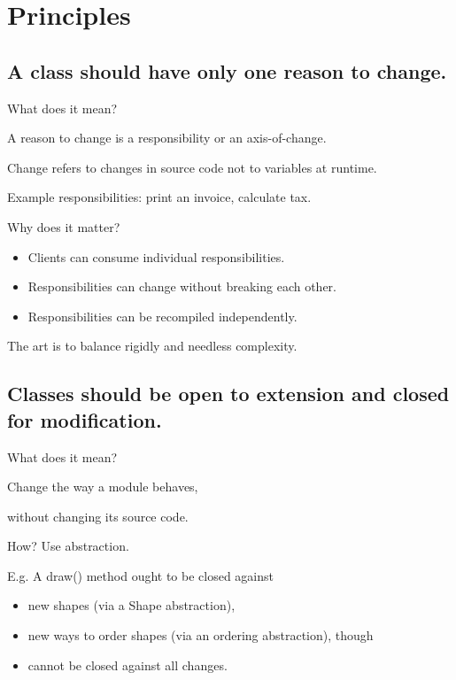 \documentclass{beamer}
\begin{document}
\section{Principles}

\subsection{A class should have only one reason to change.}

\begin{frame}{What does it mean?}
    \par A reason to change is a responsibility or an axis-of-change.
    \par Change refers to changes in source code not to variables at runtime.
    \par Example responsibilities: print an invoice, calculate tax.
\end{frame}

\begin{frame}{Why does it matter?}
    \begin{itemize}
        \item Clients can consume individual responsibilities.
        \item Responsibilities can change without breaking each other.
        \item Responsibilities can be recompiled independently.
    \end{itemize}
    \par The art is to balance rigidly and needless complexity. 
\end{frame}

\begin{frame}{}
    
\end{frame}

\begin{frame}{}
    
\end{frame}

\subsection{Classes should be open to extension and closed for modification.}

\begin{frame}{What does it mean?}
    \par Change the way a module behaves,
    \par without changing its source code.
    \par How? Use abstraction.
    \par E.g. A draw() method ought to be closed against
    \begin{itemize}
        \item new shapes (via a Shape abstraction),
        \item new ways to order shapes (via an ordering abstraction), though
        \item cannot be closed against all changes. 
    \end{itemize}
\end{frame}
\end{document}
